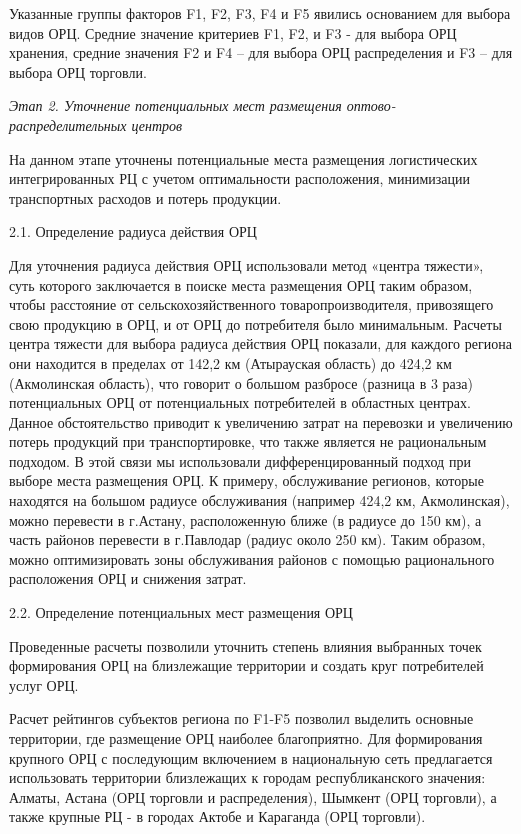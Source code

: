 \begin{multicols}{2}
Указанные группы факторов F1, F2, F3, F4 и F5 явились основанием для
выбора видов ОРЦ. Средние значение критериев F1, F2, и F3 - для выбора
ОРЦ хранения, средние значения F2 и F4 -- для выбора ОРЦ распределения и
F3 -- для выбора ОРЦ торговли.

\emph{Этап 2. Уточнение потенциальных мест размещения
оптово-распределительных центров}

На данном этапе уточнены потенциальные места размещения логистических
интегрированных РЦ с учетом оптимальности расположения, минимизации
транспортных расходов и потерь продукции.

2.1. Определение радиуса действия ОРЦ

Для уточнения радиуса действия ОРЦ использовали метод «центра тяжести»,
суть которого заключается в поиске места размещения ОРЦ таким образом,
чтобы расстояние от сельскохозяйственного товаропроизводителя,
привозящего свою продукцию в ОРЦ, и от ОРЦ до потребителя было
минимальным. Расчеты центра тяжести для выбора радиуса действия ОРЦ
показали, для каждого региона они находится в пределах от 142,2 км
(Атырауская область) до 424,2 км (Акмолинская область), что говорит о
большом разбросе (разница в 3 раза) потенциальных ОРЦ от потенциальных
потребителей в областных центрах. Данное обстоятельство приводит к
увеличению затрат на перевозки и увеличению потерь продукций при
транспортировке, что также является не рациональным подходом. В этой
связи мы использовали дифференцированный подход при выборе места
размещения ОРЦ. К примеру, обслуживание регионов, которые находятся на
большом радиусе обслуживания (например 424,2 км, Акмолинская), можно
перевести в г.Астану, расположенную ближе (в радиусе до 150 км), а часть
районов перевести в г.Павлодар (радиус около 250 км). Таким образом,
можно оптимизировать зоны обслуживания районов с помощью рационального
расположения ОРЦ и снижения затрат.

2.2. Определение потенциальных мест размещения ОРЦ

Проведенные расчеты позволили уточнить степень влияния выбранных точек
формирования ОРЦ на близлежащие территории и создать круг потребителей
услуг ОРЦ.

Расчет рейтингов субъектов региона по F1-F5 позволил выделить основные
территории, где размещение ОРЦ наиболее благоприятно. Для формирования
крупного ОРЦ с последующим включением в национальную сеть предлагается
использовать территории близлежащих к городам республиканского значения:
Алматы, Астана (ОРЦ торговли и распределения), Шымкент (ОРЦ торговли), а
также крупные РЦ - в городах Актобе и Караганда (ОРЦ торговли).


\end{multicols}
